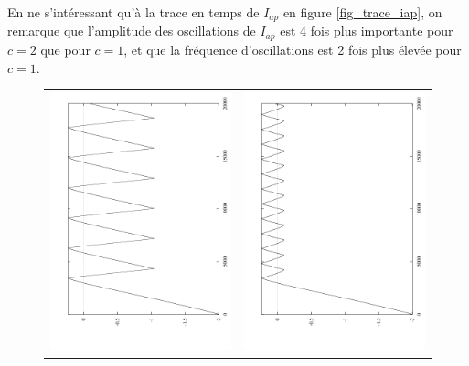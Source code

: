 \documentclass[12pt,a4paper,onecolumn]{article}
\begin{document}
En ne s'intéressant qu'à la trace en temps de $I_{ap}$ en figure \ref{fig_trace_iap}, on remarque que l'amplitude des oscillations de $I_{ap}$ est 4 fois plus importante pour $c=2$ que pour $c=1$, et que la fréquence d'oscillations est 2 fois plus élevée pour $c=1$.

\begin{figure}[H]
	\begin{center}
		\begin{tabular}{p{}  p{}}
			\includegraphics[width = 0.7\linewidth, angle = 270]{Iap_c_2.png}\subcaption{Pour $c=2$} & \includegraphics[width = 0.7\linewidth, angle = 270]{Iap_c_1.png}\subcaption{Pour $c=1$}

\end{tabular}
\end{center}
\end{figure}
\end{document}
